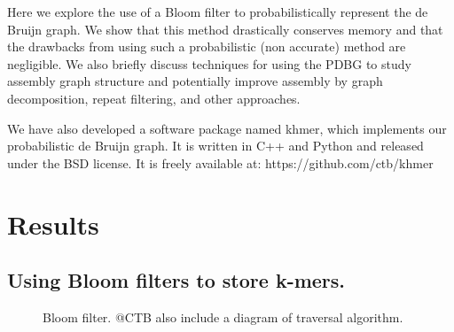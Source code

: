 \documentclass[12pt]{article} \usepackage{simplemargins}
\begin{document}
Here we explore the use of a Bloom filter to probabilistically
represent the de Bruijn graph. We show that this method drastically
conserves memory and that the drawbacks from using such a
probabilistic (non accurate) method are negligible.  We also briefly
discuss techniques for using the PDBG to study assembly graph structure
and potentially improve assembly by graph decomposition, repeat filtering, and
other approaches.

We have also developed a software package named khmer, which
implements our probabilistic de Bruijn graph.  It is written in C++
and Python and released under the BSD license. It is freely available
at: https://github.com/ctb/khmer

\section{Results}

\subsection{Using Bloom filters to store k-mers.}


\begin{figure}
\caption{Bloom filter.  @CTB also include a diagram of traversal algorithm.}
\end{figure}
\end{document}

